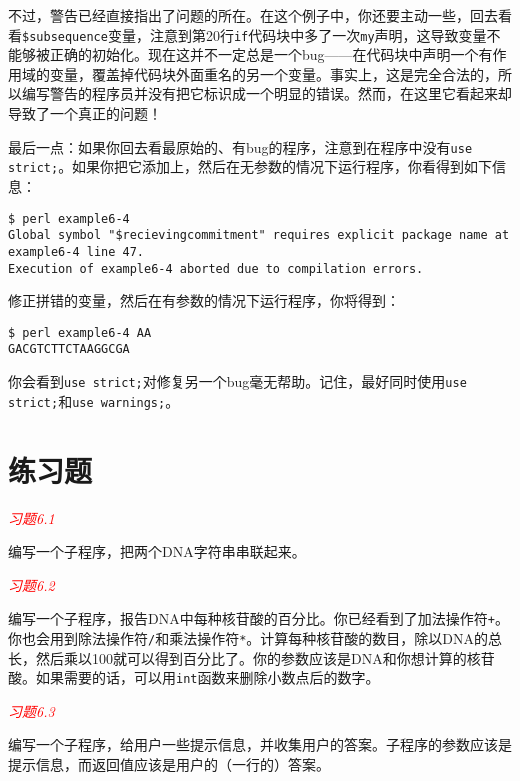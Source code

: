 不过，警告已经直接指出了问题的所在。在这个例子中，你还要主动一些，回去看看\verb|$subsequence|变量，注意到第20行\verb|if|代码块中多了一次\verb|my|声明，这导致变量不能够被正确的初始化。现在这并不一定总是一个bug——在代码块中声明一个有作用域的变量，覆盖掉代码块外面重名的另一个变量。事实上，这是完全合法的，所以编写警告的程序员并没有把它标识成一个明显的错误。然而，在这里它看起来却导致了一个真正的问题！

最后一点：如果你回去看最原始的、有bug的程序，注意到在程序中没有\verb|use strict;|。如果你把它添加上，然后在无参数的情况下运行程序，你看得到如下信息：

\begin{lstlisting}
$ perl example6-4   
Global symbol "$recievingcommitment" requires explicit package name at example6-4 line 47.
Execution of example6-4 aborted due to compilation errors.
\end{lstlisting}

修正拼错的变量，然后在有参数的情况下运行程序，你将得到：

\begin{lstlisting}
$ perl example6-4 AA
GACGTCTTCTAAGGCGA
\end{lstlisting}

你会看到\verb|use strict;|对修复另一个bug毫无帮助。记住，最好同时使用\verb|use strict;|和\verb|use warnings;|。

\section{练习题}
\textcolor{red}{\textit{习题6.1}}
\begin{adjustwidth}{1cm}{}
编写一个子程序，把两个DNA字符串串联起来。
\end{adjustwidth}

\textcolor{red}{\textit{习题6.2}}
\begin{adjustwidth}{1cm}{}
编写一个子程序，报告DNA中每种核苷酸的百分比。你已经看到了加法操作符\verb|+|。你也会用到除法操作符\verb|/|和乘法操作符\verb|*|。计算每种核苷酸的数目，除以DNA的总长，然后乘以100就可以得到百分比了。你的参数应该是DNA和你想计算的核苷酸。如果需要的话，可以用\verb|int|函数来删除小数点后的数字。
\end{adjustwidth}

\textcolor{red}{\textit{习题6.3}}
\begin{adjustwidth}{1cm}{}
编写一个子程序，给用户一些提示信息，并收集用户的答案。子程序的参数应该是提示信息，而返回值应该是用户的（一行的）答案。
\end{adjustwidth}

